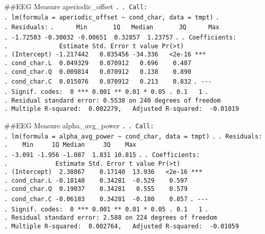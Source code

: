 \documentclass[
]{article}
\begin{document}
\#\#EEG Measure aperiodic\_offset \texttt{.} \texttt{.\ Call:}
\texttt{.\ lm(formula\ =\ aperiodic\_offset\ \textasciitilde{}\ cond\_char,\ data\ =\ tmpt)}
\texttt{.} \texttt{.\ Residuals:}
\texttt{.\ \ \ \ \ \ Min\ \ \ \ \ \ \ 1Q\ \ \ Median\ \ \ \ \ \ \ 3Q\ \ \ \ \ \ Max}
\texttt{.\ -1.72503\ -0.30032\ -0.00651\ \ 0.32857\ \ 1.23757}
\texttt{.} \texttt{.\ Coefficients:}
\texttt{.\ \ \ \ \ \ \ \ \ \ \ \ \ \ Estimate\ Std.\ Error\ t\ value\ Pr(\textgreater{}\textbar{}t\textbar{})}
\texttt{.\ (Intercept)\ -1.217442\ \ \ 0.035456\ -34.336\ \ \ \textless{}2e-16\ ***}
\texttt{.\ cond\_char.L\ \ 0.049329\ \ \ 0.070912\ \ \ 0.696\ \ \ \ 0.487}
\texttt{.\ cond\_char.Q\ \ 0.009814\ \ \ 0.070912\ \ \ 0.138\ \ \ \ 0.890}
\texttt{.\ cond\_char.C\ \ 0.015076\ \ \ 0.070912\ \ \ 0.213\ \ \ \ 0.832}
\texttt{.\ -\/-\/-}
\texttt{.\ Signif.\ codes:\ \ 0\ \textquotesingle{}***\textquotesingle{}\ 0.001\ \textquotesingle{}**\textquotesingle{}\ 0.01\ \textquotesingle{}*\textquotesingle{}\ 0.05\ \textquotesingle{}.\textquotesingle{}\ 0.1\ \textquotesingle{}\ \textquotesingle{}\ 1}
\texttt{.}
\texttt{.\ Residual\ standard\ error:\ 0.5538\ on\ 240\ degrees\ of\ freedom}
\texttt{.\ Multiple\ R-squared:\ \ 0.002279,\ \ \ Adjusted\ R-squared:\ \ -0.01019}

\#\#EEG Measure alpha\_avg\_power \texttt{.} \texttt{.\ Call:}
\texttt{.\ lm(formula\ =\ alpha\_avg\_power\ \textasciitilde{}\ cond\_char,\ data\ =\ tmpt)}
\texttt{.} \texttt{.\ Residuals:}
\texttt{.\ \ \ \ Min\ \ \ \ \ 1Q\ Median\ \ \ \ \ 3Q\ \ \ \ Max}
\texttt{.\ -3.091\ -1.956\ -1.087\ \ 1.831\ 10.815} \texttt{.}
\texttt{.\ Coefficients:}
\texttt{.\ \ \ \ \ \ \ \ \ \ \ \ \ Estimate\ Std.\ Error\ t\ value\ Pr(\textgreater{}\textbar{}t\textbar{})}
\texttt{.\ (Intercept)\ \ 2.38867\ \ \ \ 0.17140\ \ 13.936\ \ \ \textless{}2e-16\ ***}
\texttt{.\ cond\_char.L\ -0.18140\ \ \ \ 0.34281\ \ -0.529\ \ \ \ 0.597}
\texttt{.\ cond\_char.Q\ \ 0.19037\ \ \ \ 0.34281\ \ \ 0.555\ \ \ \ 0.579}
\texttt{.\ cond\_char.C\ -0.06183\ \ \ \ 0.34281\ \ -0.180\ \ \ \ 0.857}
\texttt{.\ -\/-\/-}
\texttt{.\ Signif.\ codes:\ \ 0\ \textquotesingle{}***\textquotesingle{}\ 0.001\ \textquotesingle{}**\textquotesingle{}\ 0.01\ \textquotesingle{}*\textquotesingle{}\ 0.05\ \textquotesingle{}.\textquotesingle{}\ 0.1\ \textquotesingle{}\ \textquotesingle{}\ 1}
\texttt{.}
\texttt{.\ Residual\ standard\ error:\ 2.588\ on\ 224\ degrees\ of\ freedom}
\texttt{.\ Multiple\ R-squared:\ \ 0.002764,\ \ \ Adjusted\ R-squared:\ \ -0.01059}
\end{document}
